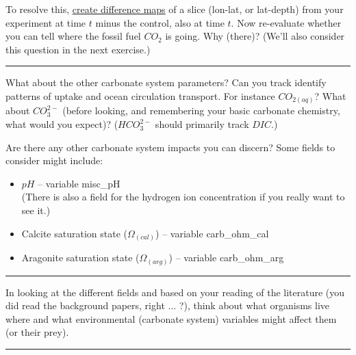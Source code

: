 To resolve this, \uline{create difference maps} of a slice (lon-lat, or lat-depth) from your experiment at time \(t\) minus the control, also at time \(t\). Now re-evaluate whether you can tell where the fossil fuel \(CO_{2}\) is going. Why (there)? (We'll also consider this question in the next exercise.)

\vspace{1mm} \noindent\rule{4cm}{0.1mm} \vspace{2mm}

\noindent What about the other carbonate system parameters? Can you track identify patterns of uptake and ocean circulation transport. For instance \(CO_{2(aq)}\)? What about \(CO^{2-}_{3}\) (before looking, and remembering your basic carbonate chemistry, what would you expect)? (\(HCO^{2-}_{3}\) should primarily track \(DIC\).)

Are there any other carbonate system impacts you can discern? Some fields to consider might include:

\vspace{1mm}
\begin{itemize}[noitemsep]
\item \(pH\) -- variable \textsf{\footnotesize misc\_pH} 
\\(There is also a field for the hydrogen ion concentration if you really want to see it.)
\item Calcite saturation state (\(\Omega_{(cal)}\)) -- variable \textsf{\footnotesize carb\_ohm\_cal}
\item Aragonite saturation state (\(\Omega_{(arg)}\)) -- variable \textsf{\footnotesize carb\_ohm\_arg} 
\end{itemize}

\vspace{1mm} \noindent\rule{4cm}{0.1mm} \vspace{2mm}

\noindent In looking at the different fields and based on your reading of the literature (you did read the background papers, right ... ?), think about what organisms live where and what environmental (carbonate system) variables might affect them (or their prey).

\vspace{1mm} \noindent\rule{4cm}{0.1mm} \vspace{2mm}

